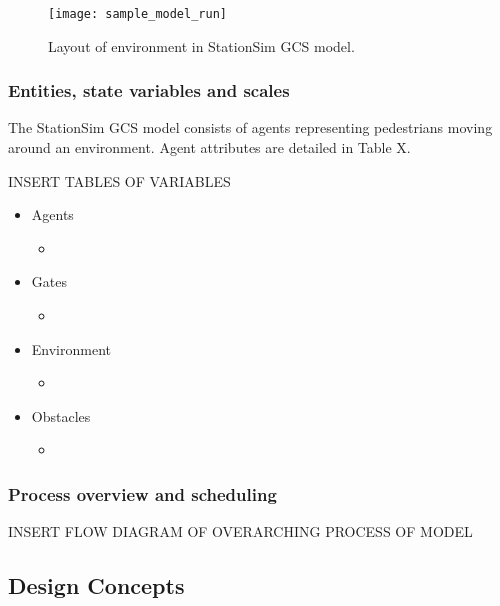 \begin{figure}[h]
    \centering
    \texttt{[image: sample\_model\_run]}
    \caption{Layout of environment in StationSim GCS model.}
    \label{fig:stationsim_gcs_env}
\end{figure}

\subsubsection{Entities, state variables and scales}
\label{subs:stationsim:overview:entities}

The StationSim GCS model consists of agents representing pedestrians moving
around an environment.
Agent attributes are detailed in Table X.


INSERT TABLES OF VARIABLES

\begin{itemize}
    \item Agents
    \begin{itemize}
        \item
    \end{itemize}
    \item Gates
    \begin{itemize}
        \item
    \end{itemize}
    \item Environment
    \begin{itemize}
        \item
    \end{itemize}
    \item Obstacles
    \begin{itemize}
        \item
    \end{itemize}
\end{itemize}

\subsubsection{Process overview and scheduling}
\label{subs:stationsim:overview:process}

INSERT FLOW DIAGRAM OF OVERARCHING PROCESS OF MODEL

\subsection{Design Concepts}
\label{sub:stationsim:design_concepts}

